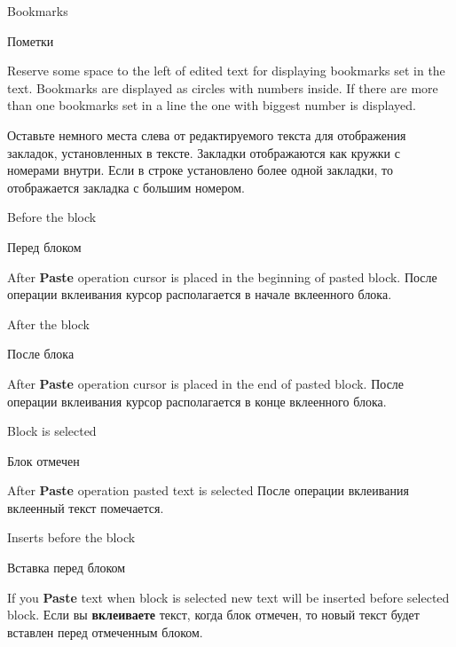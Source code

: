 \begin{popup}
\ifenglish
\caption{Bookmarks}
\else
\caption{Пометки}
\fi
{}

\ifenglish
Reserve some space to the left of edited text for displaying bookmarks set
in the text. Bookmarks are displayed as circles with numbers inside.
If there are more than one bookmarks set in a line the one with biggest
number is displayed.

\else
Оставьте немного места слева от редактируемого текста для отображения закладок,
установленных в тексте. Закладки отображаются как кружки с номерами внутри.
Если в строке установлено более одной закладки, то отображается закладка с
большим номером.
\fi
\end{popup}

\begin{popup}
\ifenglish
\caption{Before the block}
\else
\caption{Перед блоком}
\fi
{}

\ifenglish
After {\bf Paste} operation cursor is placed in the beginning of pasted block.
\else
После операции вклеивания курсор располагается в начале вклеенного блока.
\fi
\end{popup}

\begin{popup}

\ifenglish
\caption{After the block}
\else
\caption{После блока}
\fi
{}

\ifenglish
After {\bf Paste} operation cursor is placed in the end of pasted block.
\else
После операции вклеивания курсор располагается в конце вклеенного блока.
\fi
\end{popup}

\begin{popup}

\ifenglish
\caption{Block is selected}
\else
\caption{Блок отмечен}
\fi
{}
\ifenglish
After {\bf Paste} operation pasted text is selected
\else
После операции вклеивания вклеенный текст помечается.
\fi
\end{popup}

\begin{popup}
\ifenglish
\caption{Inserts before the block}
\else
\caption{Вставка перед блоком}
\fi
{}

\ifenglish
If you {\bf Paste} text when block is selected new text will be inserted before
selected block.
\else
Если вы {\bf вклеиваете} текст, когда блок отмечен, то новый текст будет вставлен
перед отмеченным блоком.
\fi
\end{popup}

